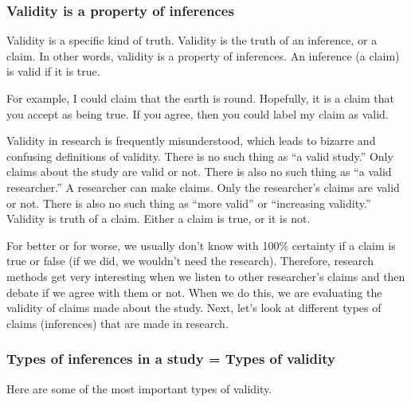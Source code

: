 \documentclass[
]{book}
\begin{document}
\hypertarget{validity-is-a-property-of-inferences}{%
\subsubsection{Validity is a property of inferences}\label{validity-is-a-property-of-inferences}}

Validity is a specific kind of truth. Validity is the truth of an inference, or a claim. In other words, validity is a property of inferences. An inference (a claim) is valid if it is true.

For example, I could claim that the earth is round. Hopefully, it is a claim that you accept as being true. If you agree, then you could label my claim as valid.

Validity in research is frequently misunderstood, which leads to bizarre and confusing definitions of validity. There is no such thing as ``a valid study.'' Only claims about the study are valid or not. There is also no such thing as ``a valid researcher.'' A researcher can make claims. Only the researcher's claims are valid or not. There is also no such thing as ``more valid'' or ``increasing validity.'' Validity is truth of a claim. Either a claim is true, or it is not.

For better or for worse, we usually don't know with 100\% certainty if a claim is true or false (if we did, we wouldn't need the research). Therefore, research methods get very interesting when we listen to other researcher's claims and then debate if we agree with them or not. When we do this, we are evaluating the validity of claims made about the study. Next, let's look at different types of claims (inferences) that are made in research.

\hypertarget{types-of-inferences-in-a-study-types-of-validity}{%
\subsubsection{Types of inferences in a study = Types of validity}\label{types-of-inferences-in-a-study-types-of-validity}}

Here are some of the most important types of validity.
\end{document}
